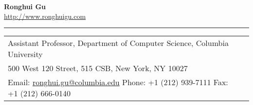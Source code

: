 \documentclass[10pt]{article}
\renewcommand{\section}[1]{
	\vspace{-5pt}
   	\subsection*{\scshape  \bfseries #1}
   }
\newcommand{\makeheading}[3][]%
        { \begin{table} \centering
        		{\LARGE\bfseries #2}\\[0.5\baselineskip]%
        		{ #3}\\[-0.15\baselineskip]%
               \rule{\columnwidth}{1pt} \vspace{-30pt}%
           \end{table}
         }
\providecommand*\url[1]{\href{#1}{#1}}
\renewcommand*\url[1]{\href{#1}{#1}}
\providecommand*\email[1]{\href{mailto:#1}{#1}}
\begin{document}
\makeheading{Ronghui Gu}{\url{http://www.ronghuigu.com}}
\thispagestyle{empty}

\vspace{10pt}
\newlength{\rcollength}\setlength{\rcollength}{0.50in}%
%
\begin{tabular}[t]{@{}p{\textwidth-\rcollength}p{\rcollength}}
\\[-1.0em]
Assistant Professor, Department of Computer Science, Columbia University \\
500 West 120 Street, 515 CSB, New York, NY 10027\\ 
Email: \email{ronghui.gu@columbia.edu} 
 \qquad
Phone: +1 (212) 939-7111 \qquad Fax: +1 (212) 666-0140 \\
\end{tabular}

\end{document}
